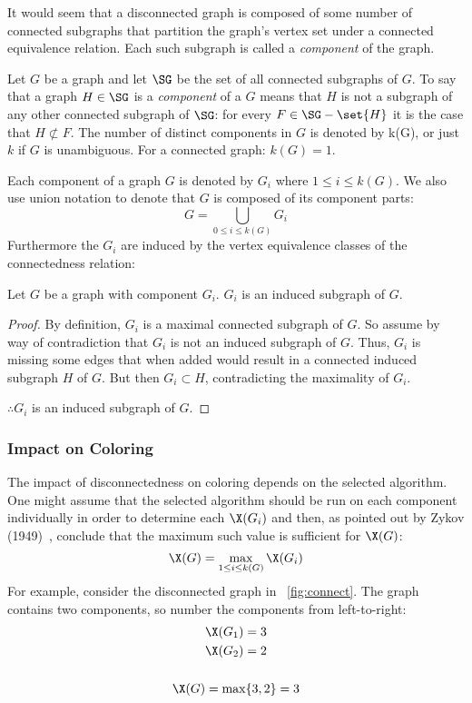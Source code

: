 It would seem that a disconnected graph is composed of some number of connected subgraphs that partition the
graph's vertex set under a connected equivalence relation.  Each such subgraph is called a \emph{component} of the
graph.

Let \(G\) be a graph and let \(\SG\) be the set of all connected subgraphs of \(G\).  To say that a graph
\(H\in\SG\) is a \emph{component} of a \(G\) means that \(H\) is not a subgraph of any other connected subgraph of
\(\SG\): for every \(F\in\SG-\set{H}\) it is the case that \(H\not\subset F\).  The number of distinct components
in \(G\) is denoted by k(G), or just \(k\) if \(G\) is unambiguous.  For a connected graph: \(k(G)=1\).

Each component of a graph \(G\) is denoted by \(G_i\) where \(1\le i\le k(G)\).  We also use union notation to
denote that \(G\) is composed of its component parts:
\[G=\bigcup_{0\le i\le k(G)}G_i\]
Furthermore the \(G_i\) are induced by the vertex equivalence classes of the connectedness relation:

\begin{theorem}
  Let \(G\) be a graph with component \(G_i\).  \(G_i\) is an induced subgraph of \(G\).
\end{theorem}

\begin{proof}
  By definition, \(G_i\) is a maximal connected subgraph of \(G\).  So assume by way of contradiction that
  \(G_i\) is not an induced subgraph of \(G\).  Thus, \(G_i\) is missing some edges that when added would result in a
  connected induced subgraph \(H\) of \(G\).  But then \(G_i\subset H\), contradicting the maximality of \(G_i\).

  \(\therefore G_i\) is an induced subgraph of \(G\).
\end{proof}

\subsubsection{Impact on Coloring}\label{sec:sub:sub:impact}

The impact of disconnectedness on coloring depends on the selected algorithm.  One might assume that the selected
algorithm should be run on each component individually in order to determine each \(\X(G_i)\) and then, as pointed
out by Zykov (1949)~\cite{zykov}, conclude that the maximum such value is sufficient for \(\X(G)\):
\[\X(G)=\max_{1\le i\le k(G)}\X(G_i)\]
For example, consider the disconnected graph in \figurename~\ref{fig:connect}.  The graph contains two components,
so number the components from left-to-right:
\begin{gather*}
  \X(G_1)=3 \\
  \X(G_2)=2 \\
  \\
  \X(G)=\max\{3,2\}=3
\end{gather*}

